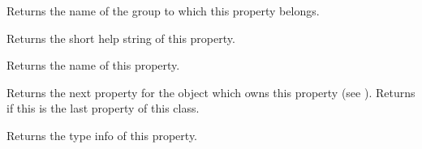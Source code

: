Returns the name of the group to which this property belongs.


\label{wxpropertyinfogethelpstring}


Returns the short help string of this property.


\label{wxpropertyinfogetname}


Returns the name of this property.


\label{wxpropertyinfogetnext}


Returns the next property for the  object which
owns this property (see ).
Returns \NULL if this is the last property of this class.


\label{wxpropertyinfogettypeinfo}


Returns the type info of this property.

